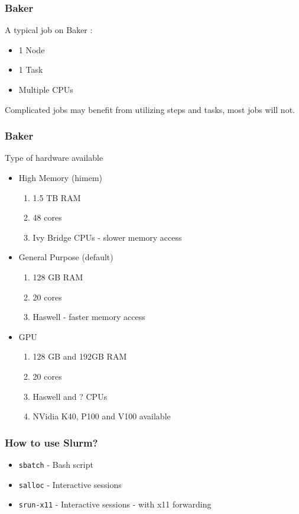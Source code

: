 \documentclass{beamer}
\newcommand{\code}[1]{\colorbox{codegray}{\texttt{#1}}}
\begin{document}
\begin{frame}
\frametitle{Baker}
A typical job on Baker : 
\begin{itemize}
    \item 1 Node 
    \pause 
    \bigskip
    \pause
    \item 1 Task
    \bigskip
    \pause
    \item Multiple CPUs
\end{itemize}
Complicated jobs may benefit from utilizing steps and tasks, most jobs will not.
\end{frame}


\begin{frame}
\frametitle{Baker}
Type of hardware available
\begin{itemize}
    \item High Memory (himem)
    \begin{enumerate}
        \item 1.5 TB RAM
        \item 48 cores 
        \item Ivy Bridge CPUs - slower memory access
    \end{enumerate}
    \pause 
    \bigskip
    \pause
    \item General Purpose (default)
    \begin{enumerate}
        \item 128 GB RAM
        \item 20 cores 
        \item Haswell - faster memory access
    \end{enumerate}
    \bigskip
    \pause
    \item GPU 
    \begin{enumerate}
        \item 128 GB and 192GB RAM 
        \item 20 cores 
        \item Haswell and ? CPUs
        \item NVidia K40, P100 and V100 available
    \end{enumerate}
\end{itemize}
\end{frame}



\begin{frame}
\frametitle{How to use Slurm?}
\begin{itemize}
    \item \code{sbatch} - Bash script
    \bigskip
    \pause
    \item \code{salloc} - Interactive sessions
    \bigskip
    \pause
    \item \code{srun-x11} - Interactive sessions - with x11 forwarding
    \bigskip
\end{itemize}
\end{frame}
\end{document}

